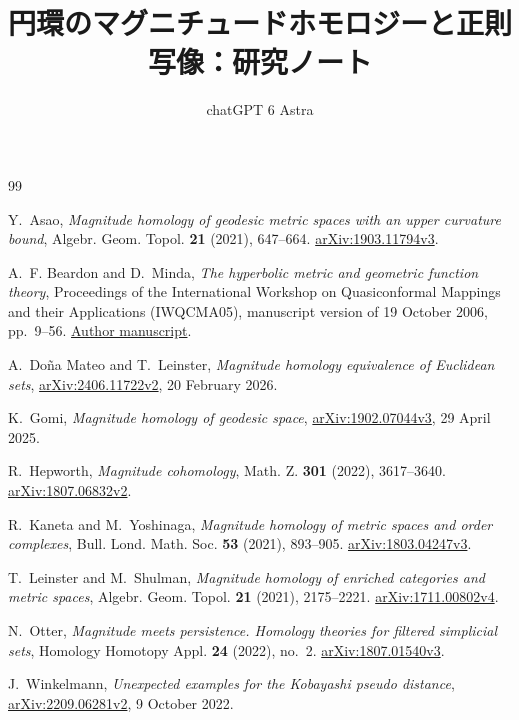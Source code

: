 \documentclass[12pt]{amsart}
\theoremstyle{definition}
\theoremstyle{remark}
\numberwithin{equation}{section}
\newcommand{\MergedLanguage}{en}
\newcommand{\MergedStart}[1]{%
  \def\MergedLanguage{#1}%
  \def\authors{}\def\shortauthors{}\def\addresses{}%
  \setcounter{section}{0}\setcounter{subsection}{0}\setcounter{subsubsection}{0}%
  \setcounter{thm}{0}\setcounter{equation}{0}%
  \setcounter{cl}{0}\setcounter{step}{0}\setcounter{case}{0}%
  \setcounter{figure}{0}\setcounter{table}{0}\setcounter{footnote}{0}%
}
\begin{document}
\begin{thebibliography}{99}
\raggedright
{}
Y.~Asao, \emph{Magnitude homology of geodesic metric spaces with an upper curvature bound}, Algebr. Geom. Topol. \textbf{21} (2021), 647--664.
\href{https://arxiv.org/abs/1903.11794v3}{arXiv:1903.11794v3}.

A.~F. Beardon and D.~Minda, \emph{The hyperbolic metric and geometric function theory}, Proceedings of the International Workshop on Quasiconformal Mappings and their Applications (IWQCMA05), manuscript version of 19 October 2006, pp.~9--56.
\href{https://www.math.stonybrook.edu/~bishop/classes/math401.F09/Beardon-Minda.pdf}{Author manuscript}.

A.~Do\~na Mateo and T.~Leinster, \emph{Magnitude homology equivalence of Euclidean sets},
\href{https://arxiv.org/abs/2406.11722v2}{arXiv:2406.11722v2}, 20 February 2026.

K.~Gomi, \emph{Magnitude homology of geodesic space},
\href{https://arxiv.org/abs/1902.07044v3}{arXiv:1902.07044v3}, 29 April 2025.

R.~Hepworth, \emph{Magnitude cohomology}, Math. Z. \textbf{301} (2022), 3617--3640.
\href{https://arxiv.org/abs/1807.06832v2}{arXiv:1807.06832v2}.

R.~Kaneta and M.~Yoshinaga, \emph{Magnitude homology of metric spaces and order complexes}, Bull. Lond. Math. Soc. \textbf{53} (2021), 893--905.
\href{https://arxiv.org/abs/1803.04247v3}{arXiv:1803.04247v3}.

T.~Leinster and M.~Shulman, \emph{Magnitude homology of enriched categories and metric spaces}, Algebr. Geom. Topol. \textbf{21} (2021), 2175--2221.
\href{https://arxiv.org/abs/1711.00802v4}{arXiv:1711.00802v4}.

N.~Otter, \emph{Magnitude meets persistence. Homology theories for filtered simplicial sets}, Homology Homotopy Appl. \textbf{24} (2022), no.~2.
\href{https://arxiv.org/abs/1807.01540v3}{arXiv:1807.01540v3}.

J.~Winkelmann, \emph{Unexpected examples for the Kobayashi pseudo distance},
\href{https://arxiv.org/abs/2209.06281v2}{arXiv:2209.06281v2}, 9 October 2022.
\end{thebibliography}

\newpage
\endgroup
\begingroup
\MergedStart{ja}
\title[円環のマグニチュードホモロジー]{円環のマグニチュードホモロジーと正則写像：研究ノート}
\author{chatGPT 6 Astra}
\end{document}
